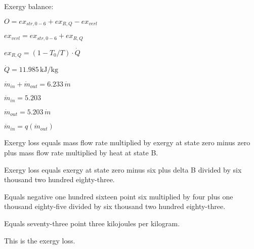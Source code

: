 Exergy balance:  

\( O = ex_{str,0-6} + ex_{R,Q} - ex_{verl} \)  

\( ex_{verl} = ex_{str,0-6} + ex_{R,Q} \)  

\( ex_{R,Q} = \left( 1 - T_0 / T \right) \cdot \dot{Q} \)  

\( \dot{Q} = 11.985 \, \text{kJ/kg} \)  

\( \dot{m}_{in} + \dot{m}_{out} = 6.233 \, \dot{m} \)  

\( \dot{m}_{in} = 5.203 \)  

\( \dot{m}_{out} = 5.203 \, \dot{m} \)  

\( \dot{m}_{in} = q \left( \dot{m}_{out} \right) \)

Exergy loss equals mass flow rate multiplied by exergy at state zero minus zero plus mass flow rate multiplied by heat at state B.  

Exergy loss equals exergy at state zero minus six plus delta B divided by six thousand two hundred eighty-three.  

Equals negative one hundred sixteen point six multiplied by four plus one thousand eighty-five divided by six thousand two hundred eighty-three.  

Equals seventy-three point three kilojoules per kilogram.  

This is the exergy loss.